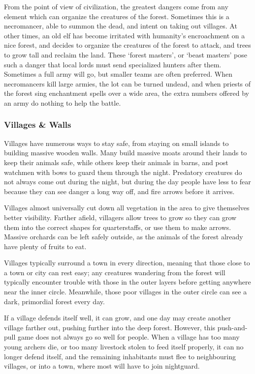 \begin{multicols}{2}
From the point of view of civilization, the greatest dangers come from any element which can organize the creatures of the forest.
Sometimes this is a necromancer, able to summon the dead, and intent on taking out villages.
At other times, an old elf has become irritated with humanity's encroachment on a nice forest, and decides to organize the creatures of the forest to attack, and trees to grow tall and reclaim the land.
These `forest masters', or `beast masters' pose such a danger that local lords must send specialized hunters after them.
Sometimes a full army will go, but smaller teams are often preferred.
When necromancers kill large armies, the lot can be turned undead, and when priests of the forest sing enchantment spells over a wide area, the extra numbers offered by an army do nothing to help the battle.

\subsubsection{Villages \& Walls}

Villages have numerous ways to stay safe, from staying on small islands to building massive wooden walls.
Many build massive moats around their lands to keep their animals safe, while others keep their animals in barns, and post watchmen with bows to guard them through the night.
Predatory creatures do not always come out during the night, but during the day people have less to fear because they can see danger a long way off, and fire arrows before it arrives.

Villages almost universally cut down all vegetation in the area to give themselves better visibility.
Farther afield, villagers allow trees to grow so they can grow them into the correct shapes for quarterstaffs, or use them to make arrows.
Massive orchards can be left safely outside, as the animals of the forest already have plenty of fruits to eat.

Villages typically surround a town in every direction, meaning that those close to a town or city can rest easy;
any creatures wandering from the forest will typically encounter trouble with those in the outer layers before getting anywhere near the inner circle.
Meanwhile, those poor villages in the outer circle can see a dark, primordial forest every day.

If a village defends itself well, it can grow, and one day may create another village farther out, pushing further into the deep forest.
However, this push-and-pull game does not always go so well for people.
When a village has too many young archers die, or too many livestock stolen to feed itself properly, it can no longer defend itself, and the remaining inhabitants must flee to neighbouring villages, or into a town, where most will have to join \gls{nightguard}.


\end{multicols}
